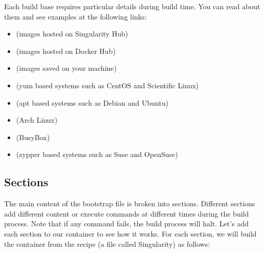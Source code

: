 \documentclass[letterpaper,10pt,english]{sphinxmanual}
\begin{document}
Each build base requires particular details during build time. You can
read about them and see examples at the following links:
\begin{itemize}
\item {} 
 (images hosted on Singularity Hub)

\item {} 
 (images hosted on Docker Hub)

\item {} 
 (images saved on your machine)

\item {} 
 (yum based systems such as CentOS and Scientific Linux)

\item {} 
 (apt based systems such as Debian and Ubuntu)

\item {} 
 (Arch Linux)

\item {} 
 (BusyBox)

\item {} 
 (zypper based systems such as Suse and OpenSuse)

\end{itemize}


\subsection{Sections}
\label{\detokenize{container_recipes:sections}}
The main content of the bootstrap file is broken into sections.
Different sections add different content or execute commands at
different times during the build process. Note that if any command
fails, the build process will halt.
Let’s add each section to our container to see how it works. For each
section, we will build the container from the recipe (a file called
Singularity) as follows:
\end{document}
